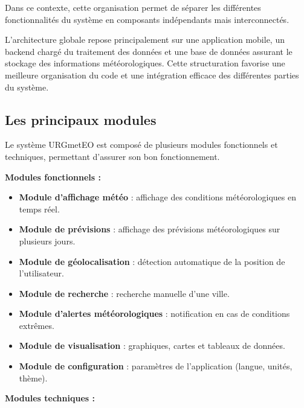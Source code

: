 \noindent Dans ce contexte, cette organisation permet de séparer les différentes fonctionnalités du système en composants indépendants mais interconnectés.

\noindent L’architecture globale repose principalement sur une application mobile, un backend chargé du traitement des données et une base de données assurant le stockage des informations météorologiques. Cette structuration favorise une meilleure organisation du code et une intégration efficace des différentes parties du système.

\subsection{Les principaux modules}

Le système URGmetEO est composé de plusieurs modules fonctionnels et techniques, permettant d’assurer son bon fonctionnement.

\noindent \textbf{Modules fonctionnels :}

\begin{itemize}

\item \textbf{Module d’affichage météo} : affichage des conditions météorologiques en temps réel.

\item \textbf{Module de prévisions} : affichage des prévisions météorologiques sur plusieurs jours.

\item \textbf{Module de géolocalisation} : détection automatique de la position de l’utilisateur.

\item \textbf{Module de recherche} : recherche manuelle d’une ville.

\item \textbf{Module d’alertes météorologiques} : notification en cas de conditions extrêmes.

\item \textbf{Module de visualisation} : graphiques, cartes et tableaux de données.

\item \textbf{Module de configuration} : paramètres de l’application (langue, unités, thème).

\end{itemize}

\noindent \textbf{Modules techniques :}

